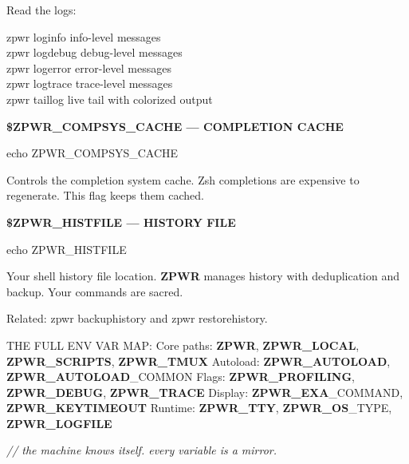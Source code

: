 \documentclass[11pt,a4paper,twoside]{book}
\begin{document}
Read the logs:

\begin{codebox}
\color{neongreen}zpwr loginfo         info-level messages\\
\color{neongreen}zpwr logdebug        debug-level messages\\
\color{neongreen}zpwr logerror        error-level messages\\
\color{neongreen}zpwr logtrace        trace-level messages\\
\color{neongreen}zpwr taillog         live tail with colorized output\\
\end{codebox}


\vspace{12pt}
{\bfseries\color{neonyellow} \$\textbf{ZPWR\_COMPSYS}\_CACHE — COMPLETION CACHE}\vspace{4pt}

\begin{codebox}
\color{neongreen}echo ZPWR\_COMPSYS\_CACHE\\
\end{codebox}

Controls the completion system cache. Zsh completions are expensive to regenerate. This flag keeps them cached.


\vspace{12pt}
{\bfseries\color{neonyellow} \$\textbf{ZPWR\_HISTFILE} — HISTORY FILE}\vspace{4pt}

\begin{codebox}
\color{neongreen}echo ZPWR\_HISTFILE\\
\end{codebox}

Your shell history file location. \textbf{ZPWR} manages history with deduplication and backup. Your commands are sacred.

Related: zpwr backuphistory and zpwr restorehistory.

THE FULL ENV VAR MAP: Core paths:      \textbf{ZPWR}, \textbf{ZPWR\_LOCAL}, \textbf{ZPWR\_SCRIPTS}, \textbf{ZPWR\_TMUX} Autoload:        \textbf{ZPWR\_AUTOLOAD}, \textbf{ZPWR\_AUTOLOAD}\_COMMON Flags:           \textbf{ZPWR\_PROFILING}, \textbf{ZPWR\_DEBUG}, \textbf{ZPWR\_TRACE} Display:         \textbf{ZPWR\_EXA}\_COMMAND, \textbf{ZPWR\_KEYTIMEOUT} Runtime:         \textbf{ZPWR\_TTY}, \textbf{ZPWR\_OS}\_TYPE, \textbf{ZPWR\_LOGFILE}

{\small\itshape\color{dimtext} // the machine knows itself. every variable is a mirror.}
\end{document}
